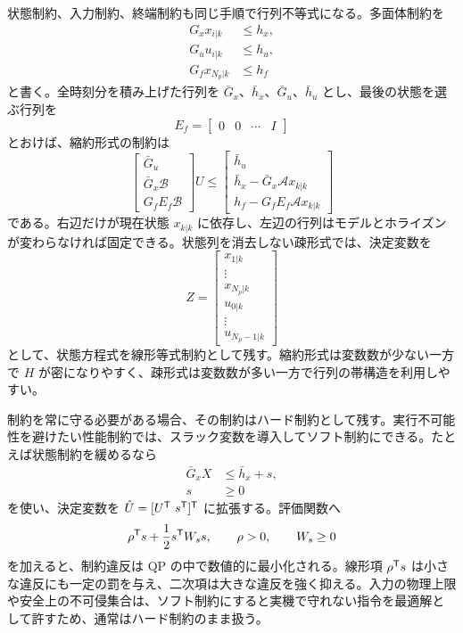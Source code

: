 状態制約、入力制約、終端制約も同じ手順で行列不等式になる。多面体制約を
\begin{align}
  G_xx_{i|k}&\le h_x,\\
  G_uu_{i|k}&\le h_u,\\
  G_fx_{N_p|k}&\le h_f
\end{align}
と書く。全時刻分を積み上げた行列を $\bar{G}_x$、$\bar{h}_x$、$\bar{G}_u$、$\bar{h}_u$ とし、最後の状態を選ぶ行列を
\begin{equation}
  E_f=
  \begin{bmatrix}
    0&0&\cdots&I
  \end{bmatrix}
\end{equation}
とおけば、縮約形式の制約は
\begin{equation}
  \begin{bmatrix}
    \bar{G}_u\\
    \bar{G}_x\mathcal{B}\\
    G_fE_f\mathcal{B}
  \end{bmatrix}U
  \le
  \begin{bmatrix}
    \bar{h}_u\\
    \bar{h}_x-\bar{G}_x\mathcal{A}x_{k|k}\\
    h_f-G_fE_f\mathcal{A}x_{k|k}
  \end{bmatrix}
\end{equation}
である。右辺だけが現在状態 $x_{k|k}$ に依存し、左辺の行列はモデルとホライズンが変わらなければ固定できる。状態列を消去しない疎形式では、決定変数を
\begin{equation}
  Z=
  \begin{bmatrix}
    x_{1|k}\\\vdots\\x_{N_p|k}\\u_{0|k}\\\vdots\\u_{N_p-1|k}
  \end{bmatrix}
\end{equation}
として、状態方程式を線形等式制約として残す。縮約形式は変数数が少ない一方で $H$ が密になりやすく、疎形式は変数数が多い一方で行列の帯構造を利用しやすい。

制約を常に守る必要がある場合、その制約はハード制約として残す。実行不可能性を避けたい性能制約では、スラック変数を導入してソフト制約にできる。たとえば状態制約を緩めるなら
\begin{align}
  \bar{G}_xX&\le\bar{h}_x+s,\\
  s&\ge0
\end{align}
を使い、決定変数を $\hat{U}=[U^{\mathsf{T}}\ s^{\mathsf{T}}]^{\mathsf{T}}$ に拡張する。評価関数へ
\begin{equation}
  \rho^{\mathsf{T}} s+\frac{1}{2}s^{\mathsf{T}} W_s s,
  \qquad
  \rho>0,
  \qquad
  W_s\ge0
\end{equation}
を加えると、制約違反は QP の中で数値的に最小化される。線形項 $\rho^{\mathsf{T}} s$ は小さな違反にも一定の罰を与え、二次項は大きな違反を強く抑える。入力の物理上限や安全上の不可侵集合は、ソフト制約にすると実機で守れない指令を最適解として許すため、通常はハード制約のまま扱う。

